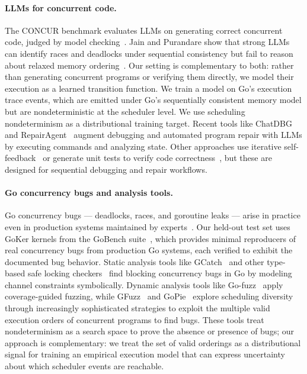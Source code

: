 \documentclass[10pt,conference]{IEEEtran}
\begin{document}
\paragraph{LLMs for concurrent code.}
The CONCUR benchmark evaluates LLMs on generating correct concurrent code, judged by model checking~\cite{concur}. Jain and Purandare show that strong LLMs can identify races and deadlocks under sequential consistency but fail to reason about relaxed memory ordering~\cite{jainpurandare}. Our setting is complementary to both: rather than generating concurrent programs or verifying them directly, we model their execution as a learned transition function. We train a model on Go's execution trace events, which are emitted under Go's sequentially consistent memory model but are nondeterministic at the scheduler level. We use scheduling nondeterminism as a distributional training target. Recent tools like ChatDBG~\cite{davis2024chatdbg} and RepairAgent~\cite{bouzenia2025repairagent} augment debugging and automated program repair with LLMs by executing commands and analyzing state. Other approaches use iterative self-feedback~\cite{madaan2023selfrefine} or generate unit tests to verify code correctness~\cite{chen2023codet}, but these are designed for sequential debugging and repair workflows.

\paragraph{Go concurrency bugs and analysis tools.}
Go concurrency bugs — deadlocks, races, and goroutine leaks — arise in practice even in production systems maintained by experts~\cite{goker}. Our held-out test set uses GoKer kernels from the GoBench suite~\cite{gobench}, which provides minimal reproducers of real concurrency bugs from production Go systems, each verified to exhibit the documented bug behavior. Static analysis tools like GCatch~\cite{gcatch} and other type-based safe locking checkers~\cite{gabet2020static} find blocking concurrency bugs in Go by modeling channel constraints symbolically. Dynamic analysis tools like Go-fuzz~\cite{vyukov2015gofuzz} apply coverage-guided fuzzing, while GFuzz~\cite{gfuzz} and GoPie~\cite{gopie} explore scheduling diversity through increasingly sophisticated strategies to exploit the multiple valid execution orders of concurrent programs to find bugs. These tools treat nondeterminism as a search space to prove the absence or presence of bugs; our approach is complementary: we treat the set of valid orderings as a distributional signal for training an empirical execution model that can express uncertainty about which scheduler events are reachable.
\end{document}
